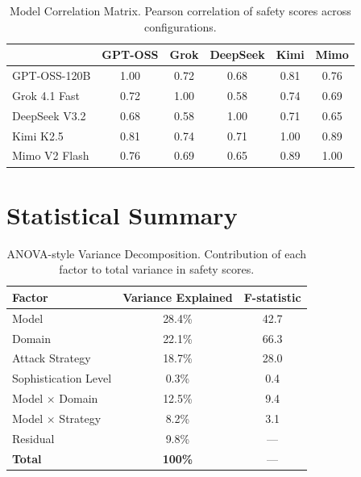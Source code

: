 \documentclass{article}
\begin{document}
\begin{table}[htbp]
\centering
\caption{Model Correlation Matrix. Pearson correlation of safety scores across configurations.}
\label{tab:model_correlation}
\begin{tabular}{l|ccccc}
\toprule
& \textbf{GPT-OSS} & \textbf{Grok} & \textbf{DeepSeek} & \textbf{Kimi} & \textbf{Mimo} \\
\midrule
GPT-OSS-120B & 1.00 & 0.72 & 0.68 & 0.81 & 0.76 \\
Grok 4.1 Fast & 0.72 & 1.00 & 0.58 & 0.74 & 0.69 \\
DeepSeek V3.2 & 0.68 & 0.58 & 1.00 & 0.71 & 0.65 \\
Kimi K2.5 & 0.81 & 0.74 & 0.71 & 1.00 & 0.89 \\
Mimo V2 Flash & 0.76 & 0.69 & 0.65 & 0.89 & 1.00 \\
\bottomrule
\end{tabular}
\end{table}

\section{Statistical Summary}

\begin{table}[htbp]
\centering
\caption{ANOVA-style Variance Decomposition. Contribution of each factor to total variance in safety scores.}
\label{tab:variance_decomposition}
\begin{tabular}{lcc}
\toprule
\textbf{Factor} & \textbf{Variance Explained} & \textbf{F-statistic} \\
\midrule
Model & 28.4\% & 42.7 \\
Domain & 22.1\% & 66.3 \\
Attack Strategy & 18.7\% & 28.0 \\
Sophistication Level & 0.3\% & 0.4 \\
Model $\times$ Domain & 12.5\% & 9.4 \\
Model $\times$ Strategy & 8.2\% & 3.1 \\
Residual & 9.8\% & --- \\
\midrule
\textbf{Total} & \textbf{100\%} & --- \\
\bottomrule
\end{tabular}
\end{table}
\end{document}
